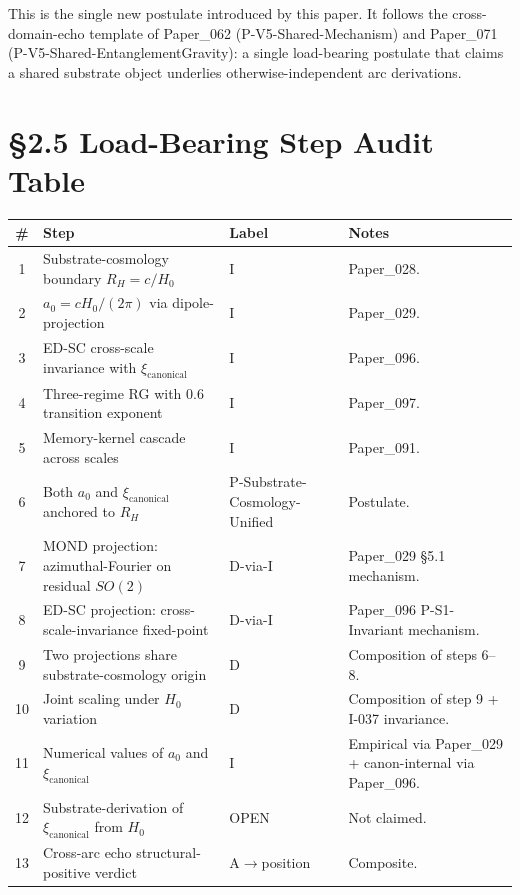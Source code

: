 \documentclass[11pt,a4paper]{article}
\begin{document}
This is the single new postulate introduced by this paper. It follows the cross-domain-echo template of Paper\_062 (P-V5-Shared-Mechanism) and Paper\_071 (P-V5-Shared-EntanglementGravity): a single load-bearing postulate that claims a shared substrate object underlies otherwise-independent arc derivations.

\section*{\S2.5 Load-Bearing Step Audit Table}

\begin{center}
\footnotesize
\begin{tabular}{cp{}p{}p{}}
\toprule
\textbf{\#} & \textbf{Step} & \textbf{Label} & \textbf{Notes} \\
\midrule
1 & Substrate-cosmology boundary $R_H = c/H_0$ & I & Paper\_028. \\
2 & $a_0 = cH_0/(2\pi)$ via dipole-projection & I & Paper\_029. \\
3 & ED-SC cross-scale invariance with $\xi_\mathrm{canonical}$ & I & Paper\_096. \\
4 & Three-regime RG with 0.6 transition exponent & I & Paper\_097. \\
5 & Memory-kernel cascade across scales & I & Paper\_091. \\
6 & Both $a_0$ and $\xi_\mathrm{canonical}$ anchored to $R_H$ & P-Substrate-Cosmology-Unified & Postulate. \\
7 & MOND projection: azimuthal-Fourier on residual $SO(2)$ & D-via-I & Paper\_029 \S5.1 mechanism. \\
8 & ED-SC projection: cross-scale-invariance fixed-point & D-via-I & Paper\_096 P-S1-Invariant mechanism. \\
9 & Two projections share substrate-cosmology origin & D & Composition of steps 6--8. \\
10 & Joint scaling under $H_0$ variation & D & Composition of step 9 + I-037 invariance. \\
11 & Numerical values of $a_0$ and $\xi_\mathrm{canonical}$ & I & Empirical via Paper\_029 + canon-internal via Paper\_096. \\
12 & Substrate-derivation of $\xi_\mathrm{canonical}$ from $H_0$ & OPEN & Not claimed. \\
13 & Cross-arc echo structural-positive verdict & A$\to$position & Composite. \\
\bottomrule
\end{tabular}
\end{center}
\end{document}
